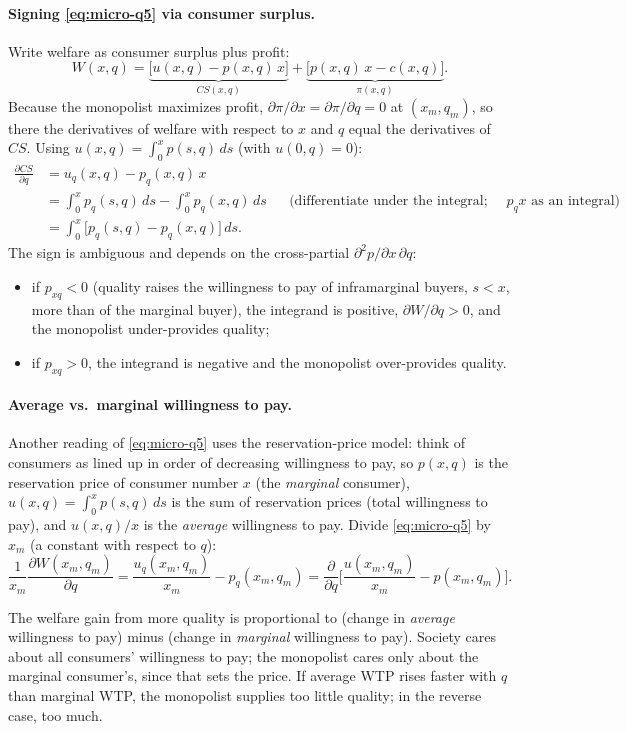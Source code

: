 \paragraph{Signing \eqref{eq:micro-q5} via consumer surplus.} Write welfare as consumer surplus plus profit:
\[
W(x,q)=\underbrace{\big[u(x,q)-p(x,q)\,x\big]}_{CS(x,q)}+\underbrace{\big[p(x,q)\,x-c(x,q)\big]}_{\pi(x,q)} .
\]
Because the monopolist maximizes profit, $\partial\pi/\partial x=\partial\pi/\partial q=0$ at $(x_m,q_m)$, so there the derivatives of welfare with respect to $x$ and $q$ equal the derivatives of $CS$. Using $u(x,q)=\int_0^x p(s,q)\,ds$ (with $u(0,q)=0$):
\begin{align*}
\frac{\partial CS}{\partial q}&=u_q(x,q)-p_q(x,q)\,x\\
&=\int_0^x p_q(s,q)\,ds-\int_0^x p_q(x,q)\,ds &&\text{(differentiate under the integral; write $p_qx$ as an integral)}\\
&=\int_0^x\big[p_q(s,q)-p_q(x,q)\big]\,ds .
\end{align*}
The sign is ambiguous and depends on the cross-partial $\partial^2p/\partial x\,\partial q$:
\begin{itemize}
\item if $p_{xq}<0$ (quality raises the willingness to pay of inframarginal buyers, $s<x$, more than of the marginal buyer), the integrand is positive, $\partial W/\partial q>0$, and the monopolist under-provides quality;
\item if $p_{xq}>0$, the integrand is negative and the monopolist over-provides quality.
\end{itemize}

\paragraph{Average vs.\ marginal willingness to pay.} Another reading of \eqref{eq:micro-q5} uses the reservation-price model: think of consumers as lined up in order of decreasing willingness to pay, so $p(x,q)$ is the reservation price of consumer number $x$ (the \emph{marginal} consumer), $u(x,q)=\int_0^x p(s,q)\,ds$ is the sum of reservation prices (total willingness to pay), and $u(x,q)/x$ is the \emph{average} willingness to pay. Divide \eqref{eq:micro-q5} by $x_m$ (a constant with respect to $q$):
\[
\frac{1}{x_m}\frac{\partial W(x_m,q_m)}{\partial q}=\frac{u_q(x_m,q_m)}{x_m}-p_q(x_m,q_m)=\frac{\partial}{\partial q}\Big[\frac{u(x_m,q_m)}{x_m}-p(x_m,q_m)\Big].
\]
\begin{keybox}[title=Spence quality distortion]
The welfare gain from more quality is proportional to (change in \emph{average} willingness to pay) minus (change in \emph{marginal} willingness to pay). Society cares about all consumers' willingness to pay; the monopolist cares only about the marginal consumer's, since that sets the price. If average WTP rises faster with $q$ than marginal WTP, the monopolist supplies too little quality; in the reverse case, too much.
\end{keybox}

